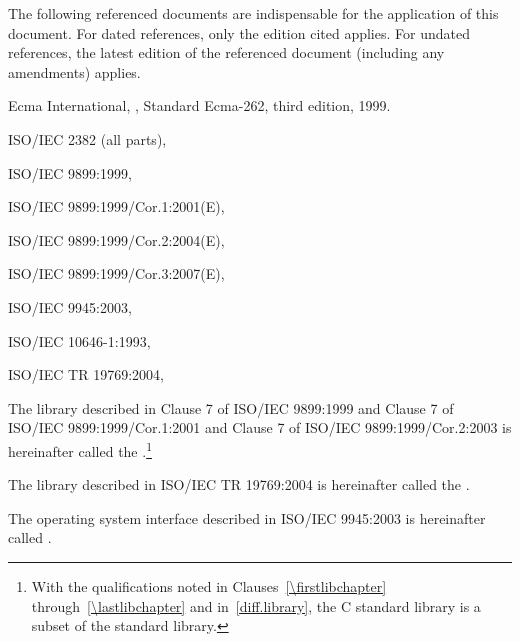 \pnum
{}%
The following referenced documents are indispensable for the application
of this document. For dated references, only the edition cited applies.
For undated references, the latest edition of the referenced document
(including any amendments) applies.

\begin{compactitem}
\item Ecma International, ,
Standard Ecma-262, third edition, 1999.
\item ISO/IEC 2382 (all parts), 
\item ISO/IEC 9899:1999, 
\item ISO/IEC 9899:1999/Cor.1:2001(E), 
\item ISO/IEC 9899:1999/Cor.2:2004(E), 
\item ISO/IEC 9899:1999/Cor.3:2007(E), 
\item ISO/IEC 9945:2003, 
\item ISO/IEC 10646-1:1993, 
\item ISO/IEC TR 19769:2004, 
\end{compactitem}

\pnum
The library described in Clause 7 of ISO/IEC 9899:1999 and Clause 7 of
ISO/IEC 9899:1999/Cor.1:2001 and Clause 7 of ISO/IEC
9899:1999/Cor.2:2003 is hereinafter called the
.\footnote{With the qualifications noted in Clauses~\ref{\firstlibchapter}
through~\ref{\lastlibchapter} and in~\ref{diff.library}, the C standard
library is a subset of the \Cpp standard library.}

\pnum
The library described in ISO/IEC TR 19769:2004 is hereinafter called the
.

\pnum
The operating system interface described in ISO/IEC 9945:2003 is
hereinafter called .


